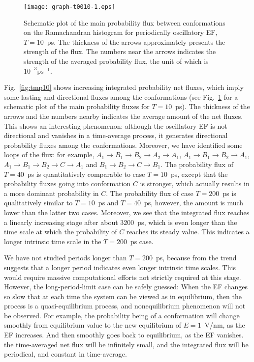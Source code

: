 \documentclass[a4paper,preprint,unsortedaddress,onecolumn]{revtex4-1}
\begin{document}
\begin{figure}
  \centering
  \texttt{[image: graph-t0010-1.eps]}
  \caption{Schematic plot of the main probability flux between conformations
    on the Ramachandran histogram
    for periodically oscillatory EF, $T=10$~ps. The thickness 
    of the arrows approximately presents the strength of the flux.
    The numbers near the arrows indicates the strength of the averaged
    probability flux, the unit of which is $10^{-3}\textrm{ps}^{-1}$.
  }
  \label{fig:tmp11}
\end{figure}
Fig.~\ref{fig:tmp10} shows increasing
integrated probability net fluxes, which imply some lasting and directional
fluxes among the conformations (see Fig.~\ref{fig:tmp11} for a schematic plot of the main probability
fluxes for $T=10$~ps).
The thickness of the arrows and the numbers nearby indicates
the average amount of the net fluxes.
This shows an interesting phenomenon: although
the oscillatory EF is not directional and vanishes in a time-average process,
it generates directional probability fluxes among the conformations.
Moreover, we have identified some loops of the flux: for example, $A_1 \rightarrow B_1
\rightarrow B_2 \rightarrow A_2 \rightarrow A_1$, $A_1 \rightarrow B_1
\rightarrow B_2 \rightarrow A_1$,  $A_1 \rightarrow B_1
\rightarrow B_2 \rightarrow C \rightarrow A_1$ and $B_1
\rightarrow B_2 \rightarrow C \rightarrow B_1$.
The probability flux of $T=40$~ps is quantitatively
comparable to case $T=10$~ps, except that the probability fluxes
going into conformation $C$ is stronger, which actually results in
a more dominant probability in $C$.
The probability flux of case $T=200$~ps is qualitatively
similar to $T=10$~ps and $T=40$~ps, however,
the amount is much lower than the latter two cases.
Moreover, we see that the integrated flux reaches a linearly increasing
stage after about 3200~ps, which is even longer than the time scale
at which the probability of $C$ reaches its steady value. This indicates
a longer intrinsic time scale in the $T=200$~ps case.

We have not studied periods longer than $T=200$~ps, because
from the trend suggests that a longer period indicates even longer intrinsic time scales.
This would require massive computational efforts not strictly required at this stage.
However, the long-period-limit case can be safely guessed: When
the EF changes so slow that at each time the system
can be viewed as in equilibrium, then the process is a quasi-equilibrium
process, and nonequilibrium phenomenon will not be observed. For example,
the probability being of a conformation will change
smoothly from equilibrium value to the new equilibrium of $E=1$~V/nm, as
the EF increases.
And then smoothly goes back to equilibrium, as the EF vanishes.
the time-averaged net flux will be infinitely small,
and the integrated flux will be periodical, and constant in time-average.
\end{document}
